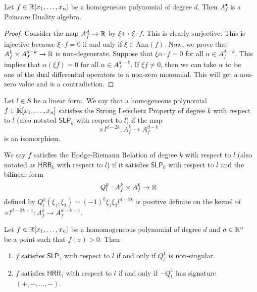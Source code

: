 \documentclass[12pt]{article}
\begin{document}
\begin{prop}
	Let $f \in \mathbb{R}[x_1, \ldots, x_n]$ be a homogeneous polynomial of degree $d$. Then $A_f^\bullet$ is a Poincare Duality algebra.
\end{prop}

\begin{proof}
	Consider the map $A_f^d \to \mathbb{R}$ by $\xi \mapsto \xi \cdot f$. This is clearly surjective. This is injective because $\xi \cdot f = 0$ if and only if $\xi \in \text{Ann}(f)$. Now, we prove that $A_f^k \times A_f^{d-k} \to \mathbb{R}$ is non-degenerate. Suppose that $\xi \alpha \cdot f = 0$ for all $\alpha \in A_f^{d-k}$. This implies that $\alpha (\xi f) = 0$ for all $\alpha \in A_f^{d-k}$. If $\xi f \neq 0$, then we can take $\alpha$ to be one of the dual differential operators to a non-zero monomial. This will get a non-zero value and is a contradiction. 
\end{proof}

\begin{defn} 
	Let $l \in S$ be a linear form. We say that a homogeneous polynomial $f \in \mathbb{R}[x_1, \ldots, x_n]$ satisfies the Strong Lefschetz Property of degree $k$ with respect to $l$ (also notated $\mathsf{SLP}_k$ with respect to $l$) if the map 
	\[
		\times l^{d-2k} : A_f^k \to A_f^{d-k}
	\]
	is an isomorphism. 
\end{defn}

\begin{defn} 
	We say $f$ satisfies the Hodge-Riemann Relation of degree $k$ with respect to $l$ (also notated as $\mathsf{HRR}_k$ with respect to $l$) if it satisfies $\mathsf{SLP}_k$ with respect to $l$ and the bilinear form 
	\[
		Q^k_l : A_f^k \times A_f^k \to \mathbb{R}
	\] 
	defined by $Q^k_l(\xi_1, \xi_2) = (-1)^k \xi_1 \xi_2 l^{d-2k}$ is positive definite on the kernel of $\times l^{d-2k+1} : A_f^k \to A_f^{d-k+1}$.
\end{defn}

\begin{lem}
	Let $f \in \mathbb{R} [x_1, \ldots, x_n]$ be a homomogeneous polynomial of degree $d$ and $a \in \mathbb{R}^n$ be a point such that $f(a) > 0$. Then 
	\begin{enumerate}[label = (\alph*)]
		\item $f$ satisfies $\mathsf{SLP}_1$ with respect to $l$ if and only if $Q_l^1$ is non-singular. 
		\item $f$ satisfies $\mathsf{HRR}_1$ with respect to $l$ if and only if $-Q_l^1$ has signature $(+, -, \ldots, -)$. 
	\end{enumerate}
\end{lem}
\end{document}
